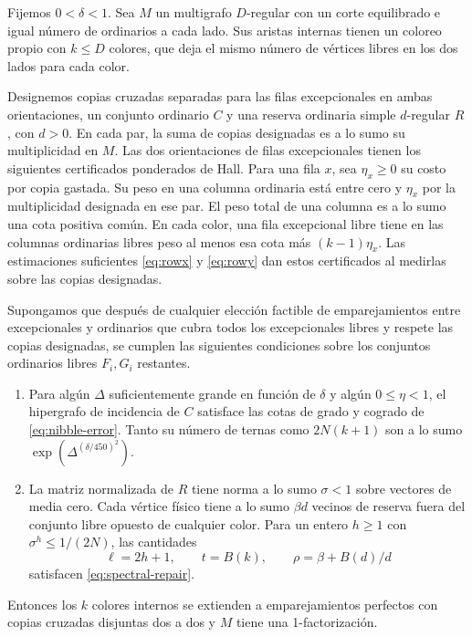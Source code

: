 \begin{theorem}\label{thm:hybrid-completion}
Fijemos \(0<\delta<1\). Sea \(M\) un multigrafo \(D\)-regular con un corte equilibrado e igual número de ordinarios a cada lado. Sus aristas internas tienen un coloreo propio con \(k\le D\) colores, que deja el mismo número de vértices libres en los dos lados para cada color.

Designemos copias cruzadas separadas para las filas excepcionales en ambas orientaciones, un conjunto ordinario \(C\) y una reserva ordinaria simple \(d\)-regular \(R\), con \(d>0\). En cada par, la suma de copias designadas es a lo sumo su multiplicidad en \(M\). Las dos orientaciones de filas excepcionales tienen los siguientes certificados ponderados de Hall. Para una fila \(x\), sea \(\eta_x\ge0\) su costo por copia gastada. Su peso en una columna ordinaria está entre cero y \(\eta_x\) por la multiplicidad designada en ese par. El peso total de una columna es a lo sumo una cota positiva común. En cada color, una fila excepcional libre tiene en las columnas ordinarias libres peso al menos esa cota más \((k-1)\eta_x\). Las estimaciones suficientes \eqref{eq:rowx} y \eqref{eq:rowy} dan estos certificados al medirlas sobre las copias designadas.

Supongamos que después de cualquier elección factible de emparejamientos entre excepcionales y ordinarios que cubra todos los excepcionales libres y respete las copias designadas, se cumplen las siguientes condiciones sobre los conjuntos ordinarios libres \(F_i,G_i\) restantes.
\begin{enumerate}
\item Para algún \(\Delta\) suficientemente grande en función de \(\delta\) y algún \(0\le\eta<1\), el hipergrafo de incidencia de \(C\) satisface las cotas de grado y cogrado de \eqref{eq:nibble-error}. Tanto su número de ternas como \(2N(k+1)\) son a lo sumo \(\exp(\Delta^{(\delta/450)^2})\).
\item La matriz normalizada de \(R\) tiene norma a lo sumo \(\sigma<1\) sobre vectores de media cero. Cada vértice físico tiene a lo sumo \(\beta d\) vecinos de reserva fuera del conjunto libre opuesto de cualquier color. Para un entero \(h\ge1\) con \(\sigma^h\le1/(2N)\), las cantidades
\[
 \ell=2h+1,\qquad t=B(k),\qquad \rho=\beta+B(d)/d
\]
satisfacen \eqref{eq:spectral-repair}.
\end{enumerate}
Entonces los \(k\) colores internos se extienden a emparejamientos perfectos con copias cruzadas disjuntas dos a dos y \(M\) tiene una 1-factorización.
\end{theorem}

